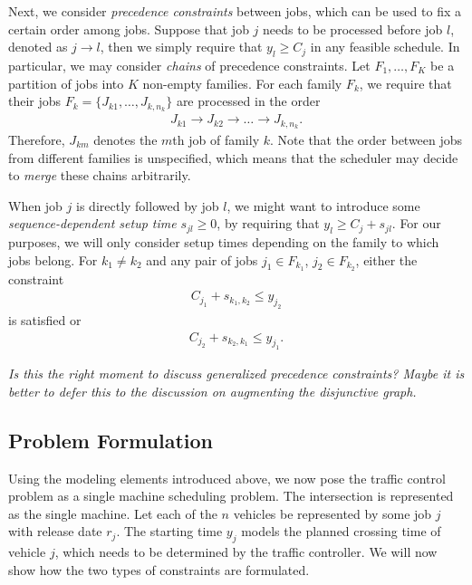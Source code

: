 \documentclass{article}
\theoremstyle{definition}
\theoremstyle{plain}
\begin{document}
Next, we consider \textit{precedence constraints} between jobs, which can be
used to fix a certain order among jobs. Suppose that job $j$ needs to be
processed before job $l$, denoted as $j \rightarrow{} l$, then we simply require
that $y_{l} \geq C_{j}$ in any feasible schedule. In particular, we may consider
\textit{chains} of precedence constraints. Let $F_{1}, \dots, F_{K}$ be a
partition of jobs into $K$ non-empty families. For each family $F_{k}$, we
require that their jobs $F_{k} = \{ J_{k1}, \dots, J_{k,n_{k}}\}$ are processed
in the order
\begin{align*}
J_{k1} \rightarrow{} J_{k2} \rightarrow{} \dots \rightarrow{} J_{k,n_{k}} .
\end{align*}
Therefore, $J_{km}$ denotes the $m$th job of family $k$.
Note that the order between jobs from different families is unspecified, which
means that the scheduler may decide to \textit{merge} these chains arbitrarily.

When job $j$ is directly followed by job $l$, we might want to introduce some
\textit{sequence-dependent setup time} $s_{jl} \geq 0$, by requiring that
$y_{l} \geq C_{j} + s_{jl}$. For our purposes, we will only consider setup times
depending on the family to which jobs belong. For $k_{1} \neq k_{2}$ and any pair
of jobs $j_{1} \in F_{k_{1}}$, $j_{2} \in F_{k_{2}}$, either the constraint
\begin{align*}
C_{j_{1}} + s_{k_{1},k_{2}} \leq y_{j_{2}}
\end{align*}
is satisfied or
\begin{align*}
C_{j_{2}} + s_{k_{2},k_{1}} \leq y_{j_{1}}.
\end{align*}

\textit{\color{blue}Is this the right moment to discuss generalized precedence
  constraints? Maybe it is better to defer this to the discussion on augmenting
  the disjunctive graph.}

\subsection{Problem Formulation}

Using the modeling elements introduced above, we now pose the traffic control
problem as a single machine scheduling problem. The intersection is represented
as the single machine. Let each of the $n$ vehicles be represented by some job
$j$ with release date $r_{j}$. The starting time $y_{j}$ models the planned
crossing time of vehicle $j$, which needs to be determined by the traffic
controller. We will now show how the two types of constraints are formulated.
\end{document}
